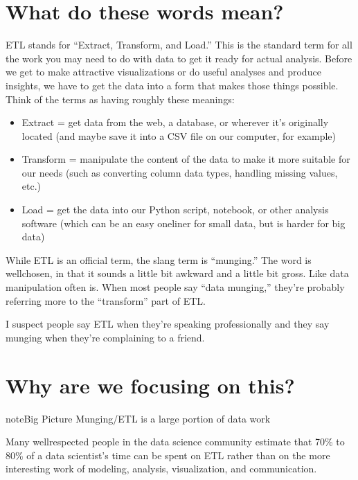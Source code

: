 \documentclass[letterpaper,10pt,english]{jupyterBook}
\begin{document}
\section{What do these words mean?}
\label{\detokenize{chapter-13-etl:what-do-these-words-mean}}
\sphinxAtStartPar
ETL stands for “Extract, Transform, and Load.”  This is the standard term for all the work you may need to do with data to get it ready for actual analysis.  Before we get to make attractive visualizations or do useful analyses and produce insights, we have to get the data into a form that makes those things possible.  Think of the terms as having roughly these meanings:
\begin{itemize}
\item {} 
\sphinxAtStartPar
Extract = get data from the web, a database, or wherever it’s originally located (and maybe save it into a CSV file on our computer, for example)

\item {} 
\sphinxAtStartPar
Transform = manipulate the content of the data to make it more suitable for our needs (such as converting column data types, handling missing values, etc.)

\item {} 
\sphinxAtStartPar
Load = get the data into our Python script, notebook, or other analysis software (which can be an easy one\sphinxhyphen{}liner for small data, but is harder for big data)

\end{itemize}

\sphinxAtStartPar
While ETL is an official term, the slang term is “munging.”  The word is well\sphinxhyphen{}chosen, in that it sounds a little bit awkward and a little bit gross.  Like data manipulation often is.  When most people say “data munging,” they’re probably referring more to the “transform” part of ETL.

\sphinxAtStartPar
I suspect people say ETL when they’re speaking professionally and they say munging when they’re complaining to a friend.


\section{Why are we focusing on this?}
\label{\detokenize{chapter-13-etl:why-are-we-focusing-on-this}}
\begin{sphinxadmonition}{note}{Big Picture \sphinxhyphen{} Munging/ETL is a large portion of data work}

\sphinxAtStartPar
Many well\sphinxhyphen{}respected people in the data science community estimate that 70\% to 80\% of a data scientist’s time can be spent on ETL rather than on the more interesting work of modeling, analysis, visualization, and communication.
\end{sphinxadmonition}
\end{document}
